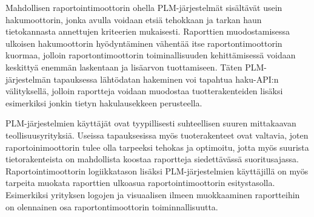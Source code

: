 Mahdollisen raportointimoottorin ohella PLM-järjestelmät sisältävät usein hakumoottorin, jonka avulla voidaan etsiä tehokkaan ja tarkan haun tietokannasta annettujen kriteerien mukaisesti. Raporttien muodostamisessa ulkoisen hakumoottorin hyödyntäminen vähentää itse raportontimoottorin kuormaa, jolloin raportontimoottorin toiminallisuuden kehittämisessä voidaan keskittyä enemmän laskentaan ja lisäarvon tuottamiseen. Täten PLM-järjestelmän tapauksessa lähtödatan hakeminen voi tapahtua haku-API:n välityksellä, jolloin raportteja voidaan muodostaa tuotterakenteiden lisäksi esimerkiksi jonkin tietyn hakulausekkeen perusteella.

PLM-järjestelmien käyttäjät ovat tyypillisesti suhteellisen suuren mittakaavan teollisuusyrityksiä. Useissa tapauksesissa myös tuoterakenteet ovat valtavia, joten raportoinimoottorin tulee olla tarpeeksi tehokas ja optimoitu, jotta myös suurista tietorakenteista on mahdollista koostaa raportteja siedettävässä suoritusajassa. Raportointimoottorin logiikkatason lisäksi PLM-järjestelmien käyttäjillä on myös tarpeita muokata raporttien ulkoasua raportointimoottorin esitystasolla. Esimerkiksi yrityksen logojen ja visuaalisen ilmeen muokkaaminen raportteihin on olennainen osa raportontimoottorin toiminnallisuutta.

